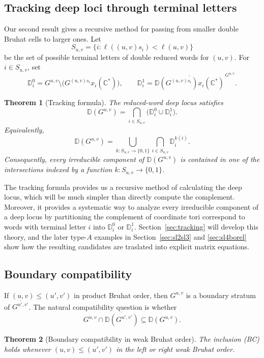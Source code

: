 \documentclass[12pt]{amsart}
\newcommand{\C}{\mathbb C}
\newcommand{\D}{\mathbb D}
\theoremstyle{plain}
\newtheorem{theorem}{Theorem}[section]
\theoremstyle{definition}
\theoremstyle{remark}
\begin{document}
\subsection{Tracking deep loci through terminal letters}

Our second result gives a recursive method for passing from smaller double Bruhat cells to larger ones.  Let
\[
S_{u,v}=\{i:\ell((u,v)s_i)<\ell(u,v)\}
\]
be the set of possible terminal letters of double reduced words for $(u,v)$.  For $i\in S_{u,v}$, set
\[
\D_i^0=G^{u,v}\setminus
   \bigl(G^{(u,v)s_i}x_i(\C^*)\bigr),
\qquad
\D_i^1=\overline{
   \D(G^{(u,v)s_i})x_i(\C^*)}^{\,G^{u,v}}.
\]

\begin{theorem}[Tracking formula]
\label{thm:intro_tracking}
The reduced-word deep locus satisfies
\[
\D(G^{u,v})
=\bigcap_{i\in S_{u,v}}
  \bigl(\D_i^0\cup\D_i^1\bigr).
\]
Equivalently,
\[
\D(G^{u,v})
=\bigcup_{k:S_{u,v}\to\{0,1\}}
  \bigcap_{i\in S_{u,v}}\D_i^{k(i)}.
\]
Consequently, every irreducible component of $\D(G^{u,v})$ is contained in one of the intersections indexed by a function $k:S_{u,v}\to\{0,1\}$.
\end{theorem}

The tracking formula provides us a recursive method of calculating the deep locus, which will be much simpler than directly compute the complement. Moreover, it provides a systematic way to analyze every irreducible component of a deep locus by partitioning the complement of coordinate tori correspond to words with terminal letter $i$ into $\D_i^0$ or $\D_i^1$. Section~\ref{sec:tracking} will develop this theory, and the later type-$A$ examples in Section~\ref{sec:sl2sl3} and \ref{sec:sl4borel} show how the resulting candidates are traslated into explicit matrix equations.

\subsection{Boundary compatibility}

If $(u,v)\leq(u',v')$ in product Bruhat order, then $G^{u,v}$ is a boundary stratum of $\overline{G^{u',v'}}$.  The natural compatibility question is whether
\[
G^{u,v}\cap\overline{\D(G^{u',v'})}
\subseteq \D(G^{u,v}).
\tag{BC}
\]

\begin{theorem}[Boundary compatibility in weak Bruhat order]
\label{thm:intro_boundary_weak}
The inclusion \textup{\rm(BC)} holds whenever $(u,v)\leq(u',v')$ in the left or right weak Bruhat order.
\end{theorem}
\end{document}
